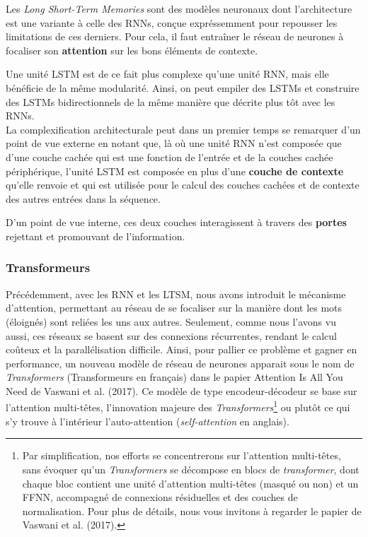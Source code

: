 \documentclass[12pt, french, twoside]{report}
\begin{document}
Les \textit{Long Short-Term Memories} sont des modèles neuronaux dont l'architecture est une variante à celle des RNNs, conçue expréssemment pour repousser les limitations de ces derniers. Pour cela, il faut entraîner le réseau de neurones à focaliser son \textbf{attention} sur les bons éléments de contexte.

Une unité LSTM est de ce fait plus complexe qu'une unité RNN, mais elle bénéficie de la même modularité. Ainsi, on peut empiler des LSTMs et construire des LSTMs bidirectionnels de la même manière que décrite plus tôt avec les RNNs.\\

La complexification architecturale peut dans un premier temps se remarquer d'un point de vue externe en notant que, là où une unité RNN n'est composée que d'une couche cachée qui est une fonction de l'entrée et de la couches cachée périphérique, l'unité LSTM est composée en plus d'une \textbf{couche de contexte} qu'elle renvoie et qui est utilisée pour le calcul des couches cachées et de contexte des autres entrées dans la séquence.

D'un point de vue interne, ces deux couches interagissent à travers des \textbf{portes} rejettant et promouvant de l'information.



\subsubsection{Transformeurs}

Précédemment, avec les RNN et les LTSM, nous avons introduit le mécanisme d'attention, permettant au réseau de se focaliser sur la manière dont les mots (éloignés) sont reliées les uns aux autres. Seulement, comme nous l'avons vu aussi, ces réseaux se basent sur des connexions récurrentes, rendant le calcul coûteux et la parallélisation difficile. Ainsi, pour pallier ce problème et gagner en performance, un nouveau modèle de réseau de neurones apparait sous le nom de \textit{Transformers} (Transformeurs en français) dans le papier \og Attention Is All You Need \fg\; de Vaswani et al. (2017)\cite{transformer}. Ce modèle de type encodeur-décodeur se base sur l'attention multi-têtes, l'innovation majeure des \textit{Transformers}\footnote{Par simplification, nos efforts se concentrerons sur l'attention multi-têtes, sans évoquer qu'un \textit{Transformers} se décompose en blocs de \textit{transformer}, dont chaque bloc contient une unité d'attention multi-têtes (masqué ou non) et un FFNN, accompagné de connexions résiduelles et des couches de normalisation. Pour plus de détails, nous vous invitons à regarder le papier de Vaswani et al. (2017)\cite{transformer}.} ou plutôt ce qui s'y trouve à l'intérieur l'auto-attention (\textit{self-attention} en anglais).\\
\end{document}
